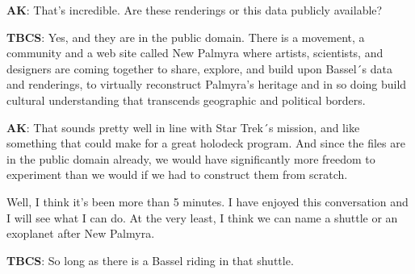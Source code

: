 \textbf{AK}: That's incredible. Are these renderings or this data
publicly available?

\textbf{TBCS}: Yes, and they are in the public domain. There is a
movement, a community and a web site called New Palmyra where artists,
scientists, and designers are coming together to share, explore, and
build upon Bassel´s data and renderings, to virtually reconstruct
Palmyra's heritage and in so doing build cultural understanding that
transcends geographic and political borders.

\textbf{AK}: That sounds pretty well in line with Star Trek´s mission,
and like something that could make for a great holodeck program. And
since the files are in the public domain already, we would have
significantly more freedom to experiment than we would if we had to
construct them from scratch.

Well, I think it's been more than 5 minutes. I have enjoyed this
conversation and I will see what I can do. At the very least, I think we
can name a shuttle or an exoplanet after New Palmyra.

\textbf{TBCS}: So long as there is a Bassel riding in that shuttle.
